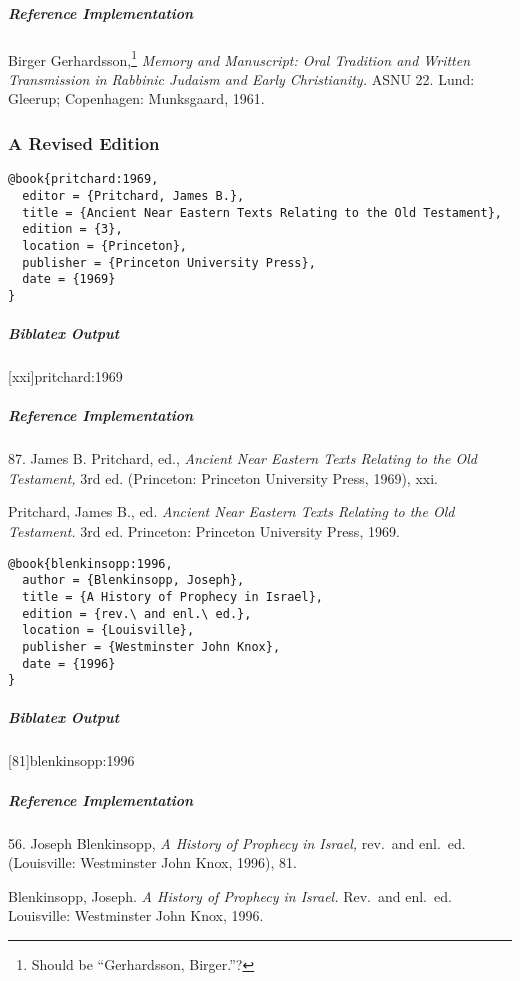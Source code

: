 \documentclass[a4paper]{article}
\newenvironment{biboutput}{%
  \subparagraph{Biblatex Output}
}{\color{black}}
\newenvironment{refimp}{%
  \subparagraph{Reference Implementation}
  \color{reference-colour}
  \rm
}{\par\color{black}}
\begin{document}
\begin{refimp}
  \hangindent\bibindent Birger Gerhardsson,\footnote{Should be “Gerhardsson,
  Birger.”?} \emph{Memory and Manuscript: Oral Tradition and Written
  Transmission in Rabbinic Judaism and Early Christianity.} ASNU 22. Lund:
  Gleerup; Copenhagen: Munksgaard, 1961.

\end{refimp}

\subsubsection{A Revised Edition}

\begin{lstlisting}
@book{pritchard:1969,
  editor = {Pritchard, James B.},
  title = {Ancient Near Eastern Texts Relating to the Old Testament},
  edition = {3},
  location = {Princeton},
  publisher = {Princeton University Press},
  date = {1969}
}
\end{lstlisting}  

\begin{biboutput}
  [xxi]{pritchard:1969}
\end{biboutput}

\begin{refimp}
  87. James B. Pritchard, ed., \emph{Ancient Near Eastern Texts Relating to
  the Old Testament,} 3rd ed. (Princeton: Princeton University Press, 1969),
  xxi.

  Pritchard, James B., ed. \emph{Ancient Near Eastern Texts Relating to the
  Old Testament.} 3rd ed. Princeton: Princeton University Press, 1969.
\end{refimp}

\begin{lstlisting}
@book{blenkinsopp:1996,
  author = {Blenkinsopp, Joseph},
  title = {A History of Prophecy in Israel},
  edition = {rev.\ and enl.\ ed.},
  location = {Louisville},
  publisher = {Westminster John Knox},
  date = {1996}
}
\end{lstlisting}  

\begin{biboutput}
  [81]{blenkinsopp:1996}
\end{biboutput}

\begin{refimp}
  56. Joseph Blenkinsopp, \emph{A History of Prophecy in Israel,} rev.\ and
  enl.\ ed. (Louisville: Westminster John Knox, 1996), 81.

  Blenkinsopp, Joseph. \emph{A History of Prophecy in Israel.} Rev.\ and enl.\
  ed. Louisville: Westminster John Knox, 1996.
\end{refimp}
\end{document}
